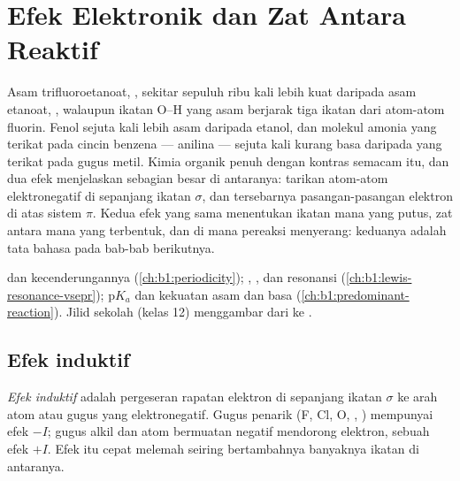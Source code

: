 \chapter{Efek Elektronik dan Zat Antara Reaktif}\label{ch:b1:electronic-effects}

Asam trifluoroetanoat, , sekitar sepuluh ribu kali lebih kuat
daripada asam etanoat, , walaupun ikatan O--H yang asam
berjarak tiga ikatan dari atom-atom fluorin. Fenol sejuta kali lebih
asam daripada etanol, dan molekul amonia yang terikat pada cincin
benzena --- anilina --- sejuta kali kurang basa daripada yang terikat
pada gugus metil. Kimia organik penuh dengan kontras semacam itu, dan dua
efek menjelaskan sebagian besar di antaranya: tarikan atom-atom
elektronegatif di sepanjang ikatan $\sigma$, dan tersebarnya
pasangan-pasangan elektron di atas sistem $\pi$. Kedua efek yang sama
menentukan ikatan mana yang putus, zat antara mana yang terbentuk, dan
di mana pereaksi menyerang: keduanya adalah tata bahasa  pada bab-bab berikutnya.

\begin{recall}
 dan kecenderungannya (\cref{ch:b1:periodicity});
, , dan resonansi
(\cref{ch:b1:lewis-resonance-vsepr}); $\mathrm{p}K_a$ dan kekuatan asam
dan basa (\cref{ch:b1:predominant-reaction}). Jilid sekolah (kelas 12)
menggambar  dari  ke .
\end{recall}

\section{Efek induktif}

\begin{definition}\label{def:b1:electronic-effects:inductive}
\emph{Efek induktif} adalah pergeseran rapatan
elektron di sepanjang ikatan $\sigma$ ke arah atom atau gugus yang
elektronegatif. Gugus penarik (F, Cl, O, , ) mempunyai
efek $-I$; gugus alkil dan atom bermuatan negatif mendorong elektron,
sebuah efek $+I$. Efek itu cepat melemah seiring bertambahnya banyaknya
ikatan di antaranya.
\end{definition}

